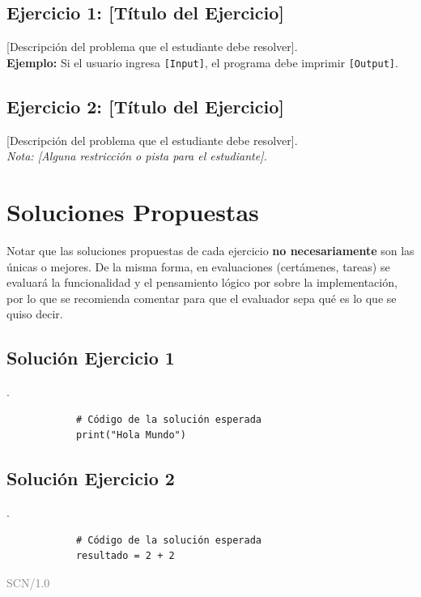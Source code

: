 \documentclass[11pt, a4paper]{article}
\begin{document}
	\subsection*{Ejercicio 1: [Título del Ejercicio]}
	[Descripción del problema que el estudiante debe resolver]. \\
	
	\textbf{Ejemplo:} Si el usuario ingresa \texttt{[Input]}, el programa debe imprimir \texttt{[Output]}.
	
	\vspace{0.5cm}
	
	\subsection*{Ejercicio 2: [Título del Ejercicio]}
	[Descripción del problema que el estudiante debe resolver]. \\
	
	\textit{Nota: [Alguna restricción o pista para el estudiante].}
	
	\newpage
	\section{Soluciones Propuestas}
	
	Notar que las soluciones propuestas de cada ejercicio \textbf{no necesariamente} son las únicas o mejores. De la misma forma, en evaluaciones (certámenes, tareas) se evaluará la funcionalidad y el pensamiento lógico por sobre la implementación, por lo que se recomienda comentar para que el evaluador sepa qué es lo que se quiso decir.
	
	\subsection*{Solución Ejercicio 1}
	\begin{solucion}
		.
		
		\begin{lstlisting}
			# Código de la solución esperada
			print("Hola Mundo")
		\end{lstlisting}
	\end{solucion}
	
	\subsection*{Solución Ejercicio 2}
	\begin{solucion}
		.
		
		\begin{lstlisting}
			# Código de la solución esperada
			resultado = 2 + 2
		\end{lstlisting}
	\end{solucion}
	
	\vfill
	\hfill \textcolor{gray}{SCN/1.0}
	
\end{document}
